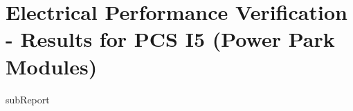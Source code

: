 \renewcommand{\DTRPcs}{I5PPM} %
\renewcommand{\DTRPcsLong}{I5 (Power Park Modules)}


    \section{Electrical Performance Verification - Results for PCS \DTRPcsLong}

    {{subReport}}
    \newpage

